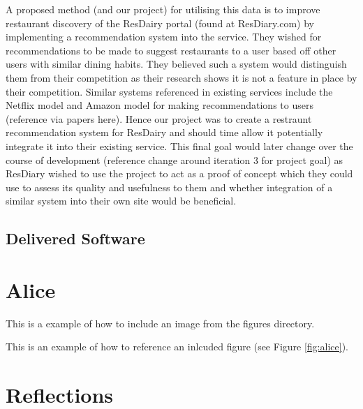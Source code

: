 \documentclass{l3proj}
\begin{document}
A proposed method (and our project) for utilising this data is to improve restaurant discovery of the ResDairy portal (found at ResDiary.com) by implementing a recommendation system into the service. They wished for recommendations to be made to suggest restaurants to a user based off other users with similar dining habits. They believed such a system would distinguish them from their competition as their research shows it is not a feature in place by their competition. Similar systems referenced in existing services include the Netflix model and Amazon model for making recommendations to users (reference via papers here). Hence our project was to create a restraunt recommendation system for ResDairy and should time allow it potentially integrate it into their existing service. This final goal would later change over the course of development (reference change around iteration 3 for project goal) as ResDiary wished to use the project to act as a proof of concept which they could use to assess its quality and usefulness to them and whether integration of a similar system into their own site would be beneficial.


\subsection{Delivered Software}
\label{finsoftware}

\newpage

\section{Alice}
\label{sec:alice}

This is a example of how to include an image from the figures directory.



This is an example of how to reference an inlcuded figure (see Figure \ref{fig:alice}).

\section{Reflections}
\label{sec:reflections}
\end{document}
